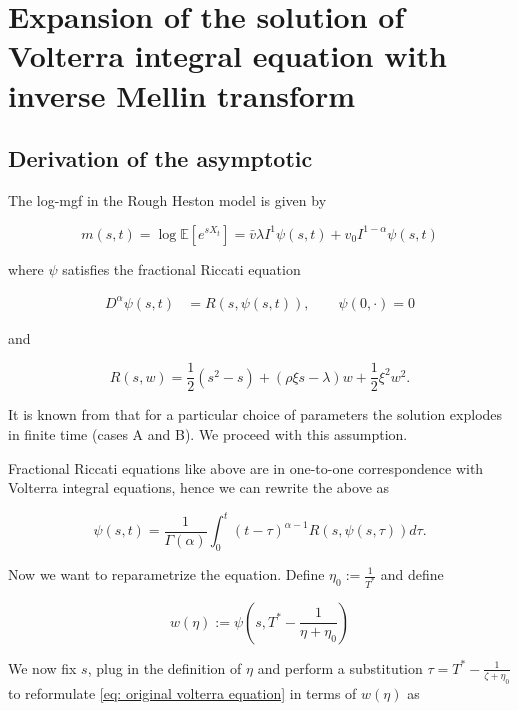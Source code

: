 \documentclass[12pt]{article}
\theoremstyle{plain}
\begin{document}
\section{Expansion of the solution of Volterra integral equation with inverse Mellin transform}

\subsection{Derivation of the asymptotic}

The log-mgf in the Rough Heston model is given by

\begin{equation} \label{logmgf}
m(s, t) = \log \mathbb{E}\left[e^{s X_{t}}\right]=\bar{v} \lambda I^{1} \psi(s, t)+v_{0} I^{1-\alpha} \psi(s, t)
\end{equation}

where $\psi$ satisfies the fractional Riccati equation

$$
\begin{aligned}
D^\alpha\psi(s,t) &= R(s, \psi(s, t)), \qquad \psi(0, \cdot) = 0
\end{aligned}
$$

and 

$$
R(s, w) = \frac{1}{2}\left(s^{2}-s\right)+(\rho \xi s - \lambda) w+\frac{1}{2} \xi ^{2} w^{2}.
$$

It is known from \cite{GGP18} that for a particular choice of parameters the solution explodes in finite time (cases A and B). We proceed with this assumption.

Fractional Riccati equations like above are in one-to-one correspondence with Volterra integral equations, hence we can rewrite the above as

\begin{equation} \label{eq: original volterra equation}
\psi(s,t) = \frac{1}{\Gamma(\alpha)} \int _0^t (t-\tau)^{\alpha-1} R(s, \psi(s, \tau)) d\tau.
\end{equation}

Now we want to reparametrize the equation. Define $\eta _0 := \frac{1}{T^*}$ and define

\begin{equation} \label{mellin w}
w(\eta) := \psi\left(s, T^* - \frac{1}{\eta + \eta_0}\right)
\end{equation}

We now fix $s$, plug in the definition of $\eta$ and perform a substitution $\tau = T^* - \frac{1}{\zeta + \eta _0}$ to reformulate \eqref{eq: original volterra equation} in terms of $w(\eta)$ as
\end{document}
